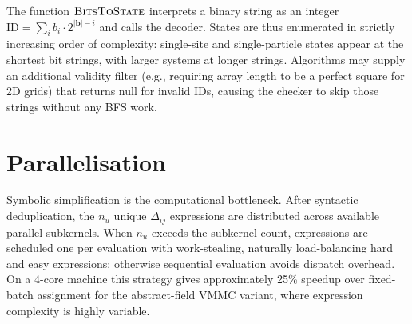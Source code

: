 \documentclass[twocolumn,10pt]{article}
\begin{document}
The function $\textsc{BitsToState}$ interprets a binary string as an integer
$\mathrm{ID}=\sum_i b_i\cdot2^{|\mathbf{b}|-i}$ and calls the decoder.  States
are thus enumerated in strictly increasing order of complexity: single-site and
single-particle states appear at the shortest bit strings, with larger systems
at longer strings.  Algorithms may supply an additional validity filter (e.g.,
requiring array length to be a perfect square for 2D grids) that returns null
for invalid IDs, causing the checker to skip those strings without any BFS work.

\section{Parallelisation}
\label{app:parallel}

Symbolic simplification is the computational bottleneck.  After syntactic
deduplication, the $n_u$ unique $\Delta_{ij}$ expressions are distributed across
available parallel subkernels.  When $n_u$ exceeds the subkernel count,
expressions are scheduled one per evaluation with work-stealing, naturally
load-balancing hard and easy expressions; otherwise sequential evaluation avoids
dispatch overhead.  On a 4-core machine this strategy gives approximately 25\%
speedup over fixed-batch assignment for the abstract-field VMMC variant, where
expression complexity is highly variable.
\end{document}
